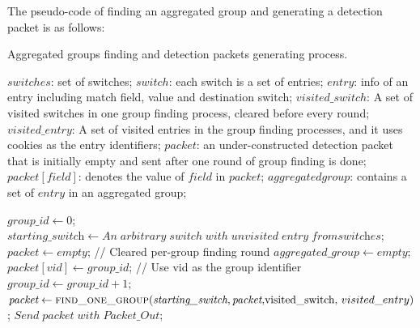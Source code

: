 \documentclass[conference]{IEEEtran}
\begin{document}
The pseudo-code of finding an aggregated group and generating a detection packet is as follows:

\label{pseudo}
\begin{algorithm}[ht]

  \caption{Aggregated groups finding and detection packets generating process.}
  \begin{algorithmic}[1]
    \Require
      $switches$: set of switches;  \newline
      $switch$: each switch is a set of entries;  \newline
      $entry$: info of an entry including match field, value and destination switch;  \newline
      $visited\_switch$: A set of visited switches in one group finding process, cleared before every round;  \newline
      $visited\_entry$: A set of visited entries in the group finding processes, and it uses cookies as the entry identifiers; \newline
      $packet$: an under-constructed detection packet that is initially empty and sent after one round of group finding is done; \newline
      $packet[field]$: denotes the value of $field$ in $packet$; \newline
      $aggregated group$: contains a set of $entry$ in an aggregated group; \newline

      
      \State $\textit{group\_id} \gets 0$;
            \State $\textit{starting\_switch} \gets An\;arbitrary\;switch\;with\;unvisited\;entry\;from\textit{switches}$;
            \State $\textit{packet} \gets empty$;   // Cleared per-group finding round
            \State $\textit{aggregated\_group} \gets empty$;
            \State $packet[vid] \gets \textit{group\_id}$;   // Use vid as the group identifier 
            \State $group\_id \gets \textit{group\_id} + 1$;
            \State $\textit{packet} \gets \Call{find\_one\_group}{\textit{starting\_switch}, \textit{packet}, $visited\_switch, $visited\_entry}$;
            \State $Send\;\textit{packet}\;with\;Packet\_Out$;
      \EndWhile
    \EndFunction
  \end{algorithmic}
\end{algorithm}
\end{document}
